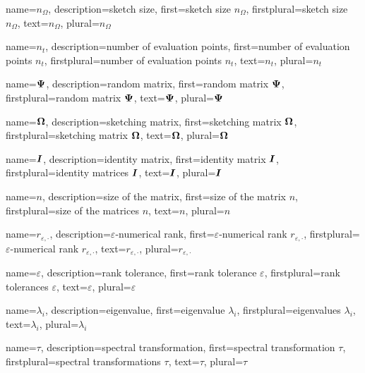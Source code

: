 {%
  name={$n_{\Omega}$},%
  description={sketch size},%
  first={sketch size $n_{\Omega}$},%
  firstplural={sketch size $n_{\Omega}$},%
  text={$n_{\Omega}$},%
  plural={$n_{\Omega}$}%
}

{%
  name={$n_t$},%
  description={number of evaluation points},%
  first={number of evaluation points $n_t$},%
  firstplural={number of evaluation points $n_t$},%
  text={$n_t$},%
  plural={$n_t$}%
}

{%
  name={$\boldsymbol{\Psi}$},%
  description={random matrix},%
  first={random matrix $\boldsymbol{\Psi}$},%
  firstplural={random matrix $\boldsymbol{\Psi}$},%
  text={$\boldsymbol{\Psi}$},%
  plural={$\boldsymbol{\Psi}$}%
}

{%
  name={$\boldsymbol{\Omega}$},%
  description={sketching matrix},%
  first={sketching matrix $\boldsymbol{\Omega}$},%
  firstplural={sketching matrix $\boldsymbol{\Omega}$},%
  text={$\boldsymbol{\Omega}$},%
  plural={$\boldsymbol{\Omega}$}%
}

{%
  name={$\boldsymbol{I}$},%
  description={identity matrix},%
  first={identity matrix $\boldsymbol{I}$},%
  firstplural={identity matrices $\boldsymbol{I}$},%
  text={$\boldsymbol{I}$},%
  plural={$\boldsymbol{I}$}%
}

{%
  name={$n$},%
  description={size of the matrix},%
  first={size of the matrix $n$},%
  firstplural={size of the matrices $n$},%
  text={$n$},%
  plural={$n$}%
}

{%
  name={$r_{\varepsilon, \cdot}$},%
  description={$\varepsilon$-numerical rank},%
  first={$\varepsilon$-numerical rank $r_{\varepsilon, \cdot}$},%
  firstplural={$\varepsilon$-numerical rank $r_{\varepsilon, \cdot}$},%
  text={$r_{\varepsilon, \cdot}$},%
  plural={$r_{\varepsilon, \cdot}$}%
}

{%
  name={$\varepsilon$},%
  description={rank tolerance},%
  first={rank tolerance $\varepsilon$},%
  firstplural={rank tolerances $\varepsilon$},%
  text={$\varepsilon$},%
  plural={$\varepsilon$}%
}

{%
  name={$\lambda_i$},%
  description={eigenvalue},%
  first={eigenvalue $\lambda_i$},%
  firstplural={eigenvalues $\lambda_i$},%
  text={$\lambda_i$},%
  plural={$\lambda_i$}%
}

{%
  name={$\tau$},%
  description={spectral transformation},%
  first={spectral transformation $\tau$},%
  firstplural={spectral transformations $\tau$},%
  text={$\tau$},%
  plural={$\tau$}%
}

